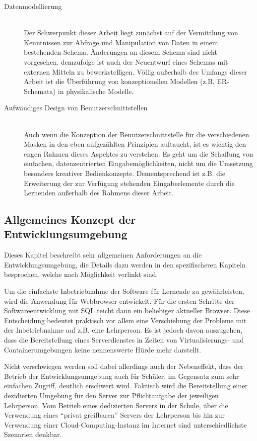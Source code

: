 \begin{description}
\item[Datenmodellierung] \hfill \\
  Der Schwerpunkt dieser Arbeit liegt zunächst auf der Vermittlung von Kenntnissen zur Abfrage und Manipulation von Daten in einem bestehenden Schema. Änderungen an diesem Schema sind nicht vorgesehen, demzufolge ist auch der Neuentwurf eines Schemas mit externen Mitteln zu bewerkstelligen. Völlig außerhalb des Umfangs dieser Arbeit ist die Überführung von konzeptionellen Modellen (z.B. ER-Schemata) in physikalische Modelle.
\item[Aufwändiges Design von Benutzerschnittstellen] \hfill \\
  Auch wenn die Konzeption der Benutzerschnittstelle für die verschiedenen Masken in den eben aufgezählten Prinzipien auftaucht, ist es wichtig den engen Rahmen dieses Aspektes zu verstehen. Es geht um die Schaffung von einfachen, datenzentrierten Eingabemöglichkeiten, nicht um die Umsetzung besonders kreativer Bedienkonzepte. Dementsprechend ist z.B. die Erweiterung der zur Verfügung stehenden Eingabeelemente durch die Lernenden außerhalb des Rahmens dieser Arbeit.
\end{description}

\subsection{Allgemeines Konzept der Entwicklungsumgebung}
\label{sec:design-general-concept}

Dieses Kapitel beschreibt sehr allgemeinen Anforderungen an die Entwicklungsumgebung, die Details dazu werden in den spezifischeren Kapiteln besprochen, welche nach Möglichkeit verlinkt sind.

Um die einfachste Inbetriebnahme der Software für Lernende zu gewährleisten, wird die Anwendung für Webbrowser entwickelt. Für die ersten Schritte der Softwareentwicklung mit SQL reicht dann ein beliebiger aktueller Browser. Diese Entscheidung bedeutet praktisch vor allem eine Verschiebung der Probleme mit der Inbetriebnahme auf z.B. eine Lehrperson. Es ist jedoch davon auszugehen, dass die Bereitstellung eines Serverdienstes in Zeiten von Virtualisierungs- und Containerumgebungen keine nennenswerte Hürde mehr darstellt.

Nicht verschwiegen werden soll dabei allerdings auch der Nebeneffekt, dass der Betrieb der Entwicklungsumgebung auch für Schüler, im Gegensatz zum sehr einfachen Zugriff, deutlich erschwert wird. Faktisch wird die Bereitstellung einer dezidierten Umgebung für den Server zur Pflichtaufgabe der jeweiligen Lehrperson. Vom Betrieb eines dedizierten Servers in der Schule, über die Verwendung eines ``privat greifbaren'' Servers der Lehrperson bis hin zur Verwendung einer Cloud-Computing-Instanz im Internet sind unterschiedlichste Szenarien denkbar.

